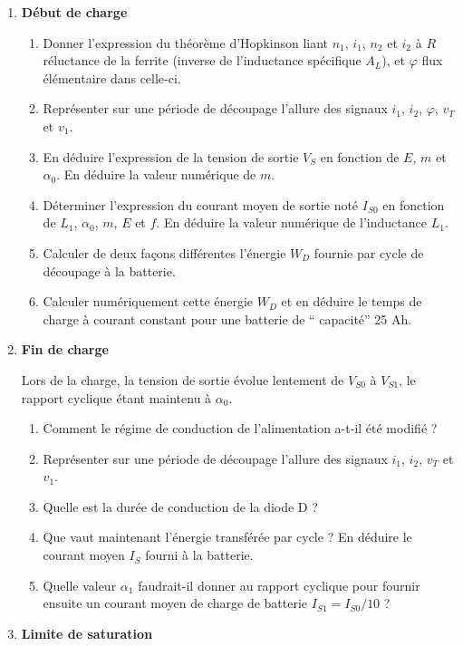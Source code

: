 \begin{enumerate}

\item \textbf{Début de charge}
\begin{enumerate}
\item Donner l’expression du théorème d’Hopkinson liant $n_1$, $i_1$, $n_2$ et $i_2$ à $R$ réluctance de la ferrite (inverse de l’inductance spécifique $A_L$),  et $\varphi$ flux élémentaire dans celle-ci.
\item Représenter sur une période de découpage l’allure des signaux $i_1$, $i_2$, $\varphi$, $v_T$ et $v_1$.
\item En déduire l'expression de la tension de sortie $V_S$ en fonction de $E$, $m$ et $\alpha_0$. En déduire la valeur numérique de $m$.
\item Déterminer l’expression du courant moyen de sortie noté $I_{S0}$ en fonction de $L_1$, $\alpha_0$, $m$, $E$ et $f$. En
déduire la valeur numérique de l’inductance $L_1$.
\item Calculer de deux façons différentes l’énergie $W_D$ fournie par cycle de découpage à la batterie.
\item Calculer numériquement cette énergie $W_D$ et en déduire le temps de charge à courant constant pour une batterie de `` capacité'' 25 Ah.
\end{enumerate}
\item \textbf{Fin de charge}

Lors de la charge, la tension de sortie évolue lentement de $V_{S0}$ à $V_{S1}$, le rapport cyclique étant maintenu à $\alpha_0$.
\begin{enumerate}
\item Comment le régime de conduction de l’alimentation a-t-il été modifié ?
\item  Représenter sur une période de découpage l’allure des signaux $ i_1$, $i_2$, $v_T$ et $v_1$.
\item Quelle est la durée de conduction de la diode D ?
\item Que vaut maintenant l’énergie transférée par cycle ? En déduire le courant moyen $I_S$ fourni à la batterie.
\item Quelle valeur $\alpha_1$ faudrait-il donner au rapport cyclique pour fournir ensuite un courant moyen de charge de batterie 
$I_{S1} = I_{S0}/10$ ?
\end{enumerate}

\item \textbf{Limite de saturation}


\end{enumerate}
